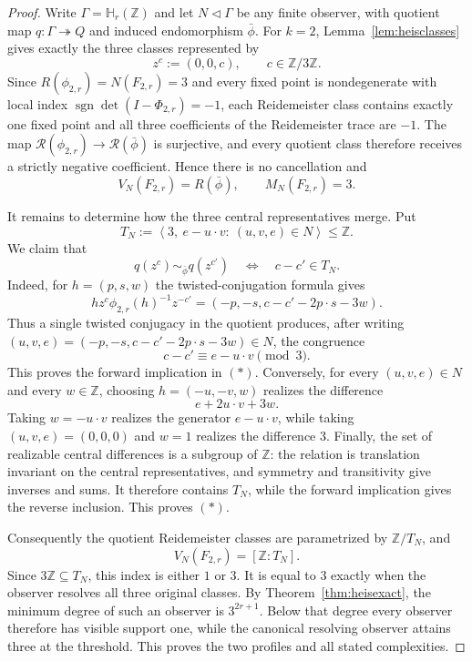 \documentclass[10pt,a4paper]{amsart}
\newcommand{\Heis}{\mathbb H}
\newcommand{\RN}{\mathcal R}
\newcommand{\Z}{\mathbb Z}
\begin{document}
\begin{proof}
Write $\Gamma=\Heis_r(\Z)$ and let
$N\triangleleft\Gamma$ be any finite observer, with quotient map
$q\colon\Gamma\twoheadrightarrow Q$ and induced endomorphism $\bar\phi$.
For $k=2$, Lemma~\ref{lem:heisclasses} gives exactly the three classes
represented by
\[
  z^c:=(0,0,c),\qquad c\in\Z/3\Z.
\]
Since $R(\phi_{2,r})=N(F_{2,r})=3$ and every fixed point is
nondegenerate with local index
$\operatorname{sgn}\det(I-\Phi_{2,r})=-1$, each Reidemeister class
contains exactly one fixed point and all three coefficients of the
Reidemeister trace are $-1$.  The map
$\RN(\phi_{2,r})\to\RN(\bar\phi)$ is surjective, and every quotient class
therefore receives a strictly negative coefficient.  Hence there is no
cancellation and
\[
  V_N(F_{2,r})=R(\bar\phi),
  \qquad
  M_N(F_{2,r})=3.
\]

It remains to determine how the three central representatives merge.  Put
\[
  T_N:=\left\langle
  3,\ e-u\!\cdot v:\ (u,v,e)\in N
  \right\rangle\le\Z.
\]
We claim that
\[
  q(z^c)\sim_{\bar\phi}q(z^{c'})
  \quad\Longleftrightarrow\quad
  c-c'\in T_N.
  \tag{\(*\)}
\]
Indeed, for $h=(p,s,w)$ the twisted-conjugation formula gives
\[
  h z^c\phi_{2,r}(h)^{-1}z^{-c'}
  =(-p,-s,c-c'-2p\!\cdot s-3w).
\]
Thus a single twisted conjugacy in the quotient produces, after writing
$(u,v,e)=(-p,-s,c-c'-2p\!\cdot s-3w)\in N$, the congruence
\[
  c-c'\equiv e-u\!\cdot v\pmod3.
\]
This proves the forward implication in $(*)$.  Conversely, for every
$(u,v,e)\in N$ and every $w\in\Z$, choosing $h=(-u,-v,w)$ realizes the
difference
\[
  e+2u\!\cdot v+3w.
\]
Taking $w=-u\!\cdot v$ realizes the generator $e-u\!\cdot v$, while
taking $(u,v,e)=(0,0,0)$ and $w=1$ realizes the difference $3$.  Finally,
the set of realizable central differences is a subgroup of $\Z$: the
relation is translation invariant on the central representatives, and
symmetry and transitivity give inverses and sums.  It therefore contains
$T_N$, while the forward implication gives the reverse inclusion.  This
proves $(*)$.

Consequently the quotient Reidemeister classes are parametrized by
$\Z/T_N$, and
\[
  V_N(F_{2,r})=[\Z:T_N].
\]
Since $3\Z\subseteq T_N$, this index is either $1$ or $3$.  It is equal to
$3$ exactly when the observer resolves all three original classes.  By
Theorem~\ref{thm:heisexact}, the minimum degree of such an observer is
$3^{2r+1}$.  Below that degree every observer therefore has visible support
one, while the canonical resolving observer attains three at the threshold.
This proves the two profiles and all stated complexities.
\end{proof}
\end{document}
